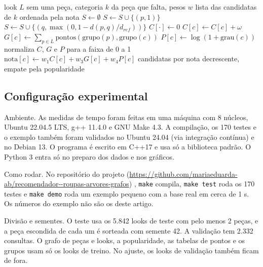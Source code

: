 \documentclass[conference]{IEEEtran}
\begin{document}
\begin{algorithm}[t]
\caption{Nota da versão F para uma consulta}
\label{alg:notaF}
\footnotesize
\begin{algorithmic}[1]
\Require look $L$ sem uma peça, categoria $k$ da peça que falta, pesos $w$
\Ensure lista das candidatas de $k$ ordenada pela nota
\State $S \gets \emptyset$ 
  \State $S \gets S \cup \{(p, 1)\}$
    \State $S \gets S \cup \{(q, \max(0, 1 - d(p,q)/d_{ref}))\}$
  \EndFor
\EndFor
\State $C[\cdot] \gets 0$
 
      \State $C[c] \gets C[c] + \omega$
    \EndFor
  \EndFor
\EndFor
{}
  \State $G[c] \gets \sum_{p \in L} \text{pontos}(\text{grupo}(p), \text{grupo}(c))$
  \State $P[c] \gets \log(1 + \text{grau}(c))$
\EndFor
\State normaliza $C$, $G$ e $P$ para a faixa de 0 a 1
\State $\text{nota}[c] \gets w_1 C[c] + w_3 G[c] + w_4 P[c]$
\State \Return candidatas por nota decrescente, empate pela popularidade
\end{algorithmic}
\end{algorithm}

\subsection{Configuração experimental}
Ambiente. As medidas de tempo foram feitas em uma máquina com 8 núcleos, Ubuntu 22.04.5 LTS, g++ 11.4.0 e GNU Make 4.3. A compilação, os 170 testes e o exemplo também foram validados no Ubuntu 24.04 (via integração contínua) e no Debian 13. O programa é escrito em C++17 e usa só a biblioteca padrão. O Python 3 entra só no preparo dos dados e nos gráficos.

Como rodar. No repositório do projeto (\url{https://github.com/mariaeduarda-ab/recomendador--roupas-arvores-grafos}) \cite{repositorio}, \texttt{make} compila, \texttt{make test} roda os 170 testes e \texttt{make demo} roda um exemplo pequeno com a base real em cerca de 1 s. Os números do exemplo não são os deste artigo.

Divisão e sementes. O teste usa os 5.842 looks de teste com pelo menos 2 peças, e a peça escondida de cada um é sorteada com semente 42. A validação tem 2.332 consultas. O grafo de peças e looks, a popularidade, as tabelas de pontos e os grupos usam só os looks de treino. No ajuste, os looks de validação também ficam de fora.
\end{document}
